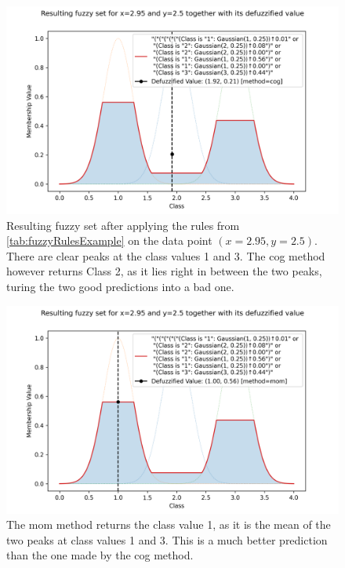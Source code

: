 \begin{multicols}{2}

    \begin{figure}[H]
        \centering
        \includegraphics[width=0.9\columnwidth,trim={0 0 0 1cm},clip]{figures/ProofOfConcepts/fuzzy_set_for_data_cog.png}
        \caption[Resulting Fuzzy Set after applying the Rules on specific Data, COG Method]{Resulting fuzzy set after applying the rules from \autoref{tab:fuzzyRulesExample} on the data point $(x=2.95, y=2.5)$. There are clear peaks at the class values 1 and 3. The \gls{cog} method however returns Class 2, as it lies right in between the two peaks, turing the two good predictions into a bad one.}
        \label{fig:fuzzySetForDataCOG}
    \end{figure}

    \columnbreak

    \begin{figure}[H]
        \centering
        \includegraphics[width=0.9\columnwidth,trim={0 0 0 1cm},clip]{figures/ProofOfConcepts/fuzzy_set_for_data_mom.png}
        \caption[Resulting Fuzzy Set after applying the Rules on specific Data, MOM Method]{The \gls{mom} method returns the class value 1, as it is the mean of the two peaks at class values 1 and 3. This is a much better prediction than the one made by the \gls{cog} method.}

        \label{fig:fuzzySetForDataMOM}
    \end{figure}

\end{multicols}

